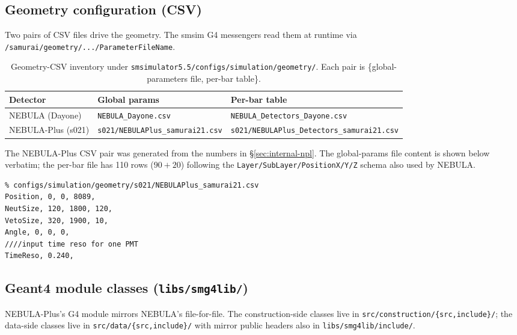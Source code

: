 \documentclass[11pt,a4paper]{article}
\newcommand{\NEB}{NEBULA}
\newcommand{\NPL}{NEBULA-Plus}
\begin{document}
\begin{CJK}{UTF8}{gbsn}
\subsection{Geometry configuration (CSV)}

Two pairs of CSV files drive the geometry. The smsim G4 messengers read them
at runtime via \texttt{/samurai/geometry/.../ParameterFileName}.

\begin{table}[h]
\centering
\caption{Geometry-CSV inventory under
\texttt{smsimulator5.5/configs/simulation/geometry/}. Each pair is
\{global-parameters file, per-bar table\}.}
\begin{tabular}{lll}
\toprule
Detector & Global params & Per-bar table\\
\midrule
\NEB{} (Dayone)    & \texttt{NEBULA\_Dayone.csv}           & \texttt{NEBULA\_Detectors\_Dayone.csv}\\
\NPL{} (s021)      & \texttt{s021/NEBULAPlus\_samurai21.csv}
                                                          & \texttt{s021/NEBULAPlus\_Detectors\_samurai21.csv}\\
\bottomrule
\end{tabular}
\end{table}

The \NPL{} CSV pair was generated from the numbers in
\S\ref{sec:internal-npl}. The global-params file content is
shown below verbatim; the per-bar file has 110 rows ($90+20$) following the
\texttt{Layer/SubLayer/PositionX/Y/Z} schema also used by \NEB{}.

\begin{lstlisting}
% configs/simulation/geometry/s021/NEBULAPlus_samurai21.csv
Position, 0, 0, 8089,
NeutSize, 120, 1800, 120,
VetoSize, 320, 1900, 10,
Angle, 0, 0, 0,
////input time reso for one PMT
TimeReso, 0.240,
\end{lstlisting}

\subsection{Geant4 module classes (\texttt{libs/smg4lib/})}

\NPL{}'s G4 module mirrors \NEB{}'s file-for-file. The construction-side
classes live in \texttt{src/construction/\{src,include\}/}; the data-side
classes live in \texttt{src/data/\{src,include\}/} with mirror public headers
also in \texttt{libs/smg4lib/include/}.


\end{CJK}
\end{document}
